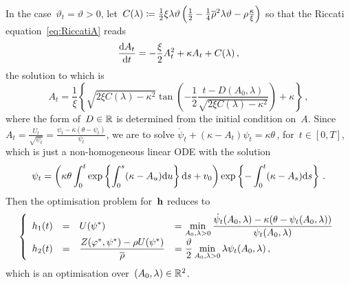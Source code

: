 \begin{example}\label{ex:HestonSmallNoiseLDP}
In the case~$\vartheta_t=\vartheta>0$, let~${C(\lambda)\coloneqq \frac12\xi\lambda\vartheta\left(\frac12-\frac14\overline{\rho}^2\lambda\vartheta-\rho\frac\kappa\xi\right)}$ so that the Riccati equation~\eqref{eq:RiccatiA} reads
\[
\frac{\mathrm{d} A_t}{\mathrm{d} t} = -\frac\xi 2 A^2_t + \kappa A_t + C(\lambda)\,,
\]
the solution to which is
$$
A_t = \frac1\xi\left\{\sqrt{2\xi C(\lambda)-\kappa^2}\tan\left(-\frac12\frac{t-D(A_0, \lambda)}{\sqrt{2\xi C(\lambda)-\kappa^2}}\right)+\kappa\right\}\,,
$$
where the form of~$D\in\mathbb{R}$ is determined from the initial condition on~$A$. Since~${A_t=\tfrac{U_t}{\sqrt{\psi_t}}=\tfrac{\dot\psi_t-\kappa(\theta-\psi_t)}{\psi_t}}$, we are to solve
$\dot\psi_t + (\kappa - A_t)\psi_t = \kappa\theta$\,,
for~$t \in[0,T]$,
which is just a non-homogeneous linear ODE with the solution
$$
\psi_t = \left(\kappa\theta\int_0^t 
\exp\left\{\int_0^s (\kappa-A_u)\mathrm{d} u\right\}\mathrm{d} s + v_0\right)
\exp\left\{-\int_0^t (\kappa-A_s)\mathrm{d} s\right\}\,.
$$
Then the optimisation problem for~$\boldsymbol{\mathrm{h}}$ reduces to
\begin{equation*}
\left\{
\begin{array}{rcll}
h_1(t)
 & = & \displaystyle U(\psi^{*})
 & = \displaystyle \min_{A_0, \lambda>0} \frac{\dot \psi_t(A_0, \lambda)-\kappa(\theta-\psi_t(A_0, \lambda))}{\psi_t(A_0, \lambda)} \\
h_2(t)
& = & \displaystyle \frac{Z(\varphi^{*}, \psi^{*})-\rho U(\psi^{*})}{\overline{\rho}}
& = \displaystyle \frac{\vartheta}{2}\min_{A_0, \lambda>0} \lambda\psi_t(A_0, \lambda)\,,
\end{array}
\right.
\end{equation*}
which is an optimisation over~$(A_0,\lambda)\in \mathbb{R}^2$.
\end{example}

